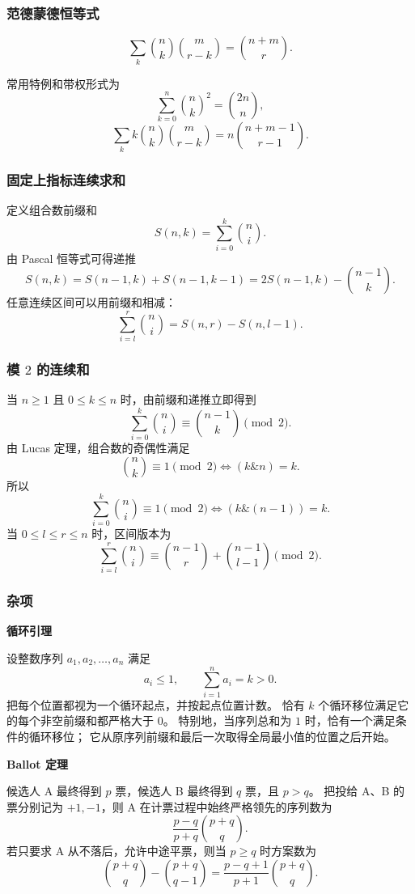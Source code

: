 \subsubsection{范德蒙德恒等式}

\[
  \sum_k\binom{n}{k}\binom{m}{r-k}
  =\binom{n+m}{r}.
\]

常用特例和带权形式为
\[
  \sum_{k=0}^{n}\binom{n}{k}^2=\binom{2n}{n},
\]
\[
  \sum_k k\binom{n}{k}\binom{m}{r-k}
  =n\binom{n+m-1}{r-1}.
\]

\subsubsection{固定上指标连续求和}

定义组合数前缀和
\[
  S(n,k)=\sum_{i=0}^{k}\binom{n}{i}.
\]
由 Pascal 恒等式可得递推
\[
  S(n,k)=S(n-1,k)+S(n-1,k-1)
  =2S(n-1,k)-\binom{n-1}{k}.
\]
任意连续区间可以用前缀和相减：
\[
  \sum_{i=l}^{r}\binom{n}{i}=S(n,r)-S(n,l-1).
\]

\subsubsection{模 $2$ 的连续和}

当 $n\ge 1$ 且 $0\le k\le n$ 时，由前缀和递推立即得到
\[
  \sum_{i=0}^{k}\binom{n}{i}
  \equiv\binom{n-1}{k}\pmod 2.
\]
由 Lucas 定理，组合数的奇偶性满足
\[
  \binom{n}{k}\equiv1\pmod2
  \iff (k\mathbin{\&}n)=k.
\]
所以
\[
  \sum_{i=0}^{k}\binom{n}{i}\equiv1\pmod2
  \iff (k\mathbin{\&}(n-1))=k.
\]
当 $0\le l\le r\le n$ 时，区间版本为
\[
  \sum_{i=l}^{r}\binom{n}{i}
  \equiv
  \binom{n-1}{r}+\binom{n-1}{l-1}
  \pmod2.
\]

\subsubsection{杂项}

\textbf{循环引理}

设整数序列 $a_1,a_2,\ldots,a_n$ 满足
\[
  a_i\le 1,
  \qquad
  \sum_{i=1}^{n}a_i=k>0.
\]
把每个位置都视为一个循环起点，并按起点位置计数。
恰有 $k$ 个循环移位满足它的每个非空前缀和都严格大于 $0$。
特别地，当序列总和为 $1$ 时，恰有一个满足条件的循环移位；
它从原序列前缀和最后一次取得全局最小值的位置之后开始。

\textbf{Ballot 定理}

候选人 A 最终得到 $p$ 票，候选人 B 最终得到 $q$ 票，且 $p>q$。
把投给 A、B 的票分别记为 $+1,-1$，则 A 在计票过程中始终严格领先的序列数为
\[
  \frac{p-q}{p+q}\binom{p+q}{q}.
\]
若只要求 A 从不落后，允许中途平票，则当 $p\ge q$ 时方案数为
\[
  \binom{p+q}{q}-\binom{p+q}{q-1}
  =\frac{p-q+1}{p+1}\binom{p+q}{q}.
\]

